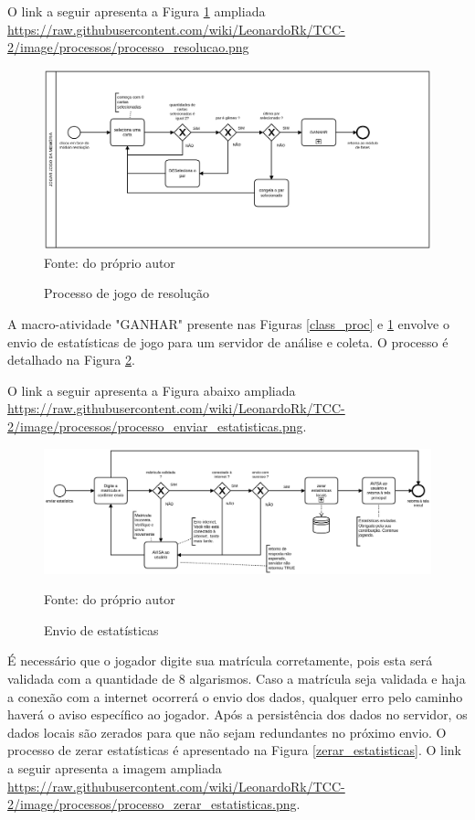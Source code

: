 O link a seguir apresenta a Figura \ref{res_proc} ampliada \url{https://raw.githubusercontent.com/wiki/LeonardoRk/TCC-2/image/processos/processo_resolucao.png}
\begin{figure}[H]
\centering
\caption{Processo de jogo de resolução}
\includegraphics[width=\textwidth,height=\textheight,keepaspectratio]{figuras/processos/processo_resolucao.png}
\label{res_proc}
\small{Fonte: do próprio autor}
\end{figure}

A macro-atividade "GANHAR" presente nas Figuras \ref{class_proc} e \ref{res_proc} envolve o envio de estatísticas de jogo para um servidor de análise e coleta. O processo é detalhado na Figura \ref{envio_estatisticas}.  

O link a seguir apresenta a Figura abaixo ampliada \url{https://raw.githubusercontent.com/wiki/LeonardoRk/TCC-2/image/processos/processo_enviar_estatisticas.png}.

\begin{figure}[H]
\centering
\caption{Envio de estatísticas}
\includegraphics[width=\textwidth,height=\textheight,keepaspectratio]{figuras/processos/processo_enviar_estatisticas.png}
\label{envio_estatisticas}

\small{Fonte: do próprio autor}
\end{figure}

É necessário que o jogador digite sua matrícula corretamente, pois esta será validada com a quantidade de 8 algarismos. Caso a matrícula seja validada e haja a conexão com a internet ocorrerá o envio dos dados, qualquer erro pelo caminho haverá o aviso específico ao jogador. Após a persistência dos dados no servidor, os dados locais são zerados para que não sejam redundantes no próximo envio. O processo de zerar estatísticas é apresentado na Figura \ref{zerar_estatisticas}. O link a seguir apresenta a imagem ampliada \url{https://raw.githubusercontent.com/wiki/LeonardoRk/TCC-2/image/processos/processo_zerar_estatisticas.png}. 

